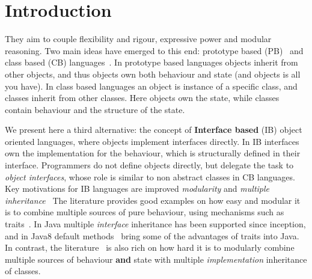 \section{Introduction}\label{sec:intro}

They aim to couple flexibility and rigour, expressive power and
modular reasoning.  Two main ideas have emerged to this end: prototype
based (PB)~\cite{} and class based (CB) languages~\cite{}.  In prototype based
languages objects inherit from other objects, and thus objects own
both behaviour and state (and objects is all you have).
In class based languages an object is instance of a specific class,
and classes inherit from other classes.  Here objects own the state,
while classes contain behaviour and the structure of the state.

We present here a third alternative: the concept of \textbf{Interface
  based} (IB) object oriented languages, where objects implement
interfaces directly. In IB interfaces own the implementation for the behaviour, which
is structurally defined in their interface. Programmers do not define objects directly, but
delegate the task to \emph{object interfaces}, whose role is similar
to non abstract classes in CB languages. Key motivations for IB
languages are improved \emph{modularity} and \emph{multiple inheritance}~  The literature
provides good examples on how easy and modular it is to combine
multiple sources of pure behaviour, using mechanisms such as
traits~\cite{scharli03traits}. 
In Java multiple \emph{interface} inheritance has been
supported since inception, and in Java8 default methods~\cite{} bring some of
the advantages of traits into Java. In contrast, the literature~\cite{} is
also rich on how hard it is to modularly combine multiple sources of
behaviour \textbf{and} state with multiple \emph{implementation}
inheritance of classes. 

